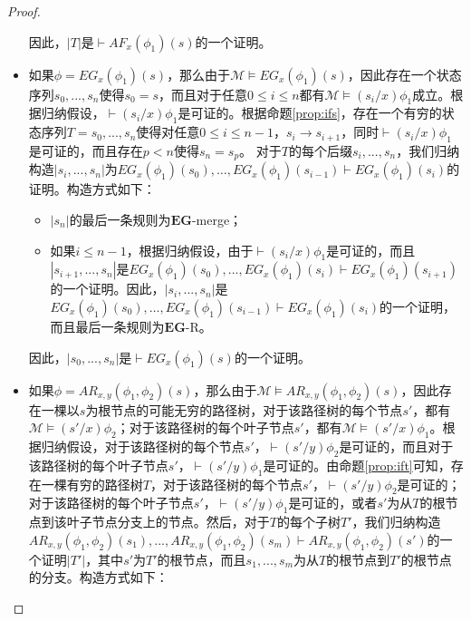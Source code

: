 \begin{proof}
\begin{itemize}
		因此，$|T|$是$\vdash AF_x(\phi_1)(s)$的一个证明。
		
		\item 如果$\phi = EG_x(\phi_1)(s)$，那么由于$\mathcal{M}\models EG_x(\phi_1)(s)$，因此存在一个状态序列$s_0,...,s_n$使得$s_0=s$，而且对于任意$0\le i\le n$都有$\mathcal{M}\models (s_i/x)\phi_1$成立。根据归纳假设，$\vdash (s_i/x)\phi_1$是可证的。根据命题\ref{prop:ifs}，存在一个有穷的状态序列$T=s_0,...,s_n$使得对任意$0\le i\le n-1$，$s_i \longrightarrow s_{i+1}$，同时$\vdash (s_i/x)\phi_1$是可证的，而且存在$p<n$使得$s_n=s_p$。
		对于$T$的每个后缀$s_i,...,s_n$，我们归纳构造$|s_i,...,s_n|$为$EG_x(\phi_1)(s_0),\ldots, EG_x(\phi_1)(s_{i-1}) \vdash EG_x(\phi_1)(s_i)$的证明。构造方式如下：
			
		\begin{itemize}

				\item $|s_n|$的最后一条规则为$\mathbf{EG}$-merge；
				
				\item 如果$i \le n-1$，根据归纳假设，由于$\vdash (s_i/x)\phi_1$是可证的，而且$|s_{i+1}, ..., s_n|$是$EG_x(\phi_1)(s_0), ..., EG_x(\phi_1)(s_i) \vdash EG_x(\phi_1)(s_{i+1})$的一个证明。因此，$|s_i, ..., s_n|$是$EG_x(\phi_1)(s_0),\ldots, EG_x(\phi_1)(s_{i-1}) \vdash EG_x(\phi_1)(s_i)$的一个证明，而且最后一条规则为$\mathbf{EG}$-\textsf{R}。
				
		\end{itemize}
			
		因此，$|s_0,...,s_n|$是$\vdash EG_x(\phi_1)(s)$的一个证明。

		\item 如果$\phi = AR_{x,y}(\phi_1, \phi_2)(s)$，那么由于$\mathcal{M}\models AR_{x,y}(\phi_1, \phi_2)(s)$，因此存在一棵以$s$为根节点的可能无穷的路径树，对于该路径树的每个节点$s'$，都有$\mathcal{M}\models (s'/x)\phi_2$；对于该路径树的每个叶子节点$s'$，都有$\mathcal{M}\models (s'/x)\phi_1$。根据归纳假设，对于该路径树的每个节点$s'$，$\vdash (s'/y)\phi_2$是可证的，而且对于该路径树的每个叶子节点$s'$，$\vdash (s'/y)\phi_1$是可证的。由命题\ref{prop:ift}可知，存在一棵有穷的路径树$T$，对于该路径树的每个节点$s'$，$\vdash (s'/y)\phi_2$是可证的；对于该路径树的每个叶子节点$s'$，$\vdash (s'/y)\phi_1$是可证的，或者$s'$为从$T$的根节点到该叶子节点分支上的节点。然后，对于$T$的每个子树$T'$，我们归纳构造$AR_{x,y}(\phi_1, \phi_2)(s_1), ..., AR_{x,y}(\phi_1,
		\phi_2)(s_m) \vdash AR_{x,y}(\phi_1, \phi_2)(s')$的一个证明$|T'|$，其中$s'$为$T'$的根节点，而且$s_1,...,s_m$为从$T$的根节点到$T'$的根节点的分支。构造方式如下：
		\begin{itemize}


\end{itemize}
\end{itemize}
\end{proof}
